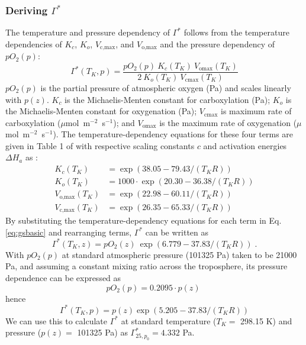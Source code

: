 \documentclass{myreport}
\begin{document}
\subsubsection{Deriving $\Gamma^\ast$}
The temperature and pressure dependency of $\Gamma^\ast$ follows from the temperature dependencies of $K_c$, $K_o$, $V_\text{c,max}$, and $V_\text{o,max}$ and the pressure dependency of $pO_2(p)$:
\begin{equation}
\label{eq:gsbasic}
    \Gamma^\ast (T_K, p) = \frac{pO_2(p)\: K_c(T_K)\: V_\text{omax}(T_K)}
                        {2\: K_o(T_K)\: V_\text{cmax}(T_K)}
\end{equation}
$pO_2(p)$ is the partial pressure of atmospheric oxygen (Pa) and scales linearly with $p(z)$. $K_c$ is the Michaelis-Menten constant for carboxylation (Pa); $K_o$ is the Michaelis-Menten constant for oxygenation (Pa); $V_\text{cmax}$ is maximum rate of carboxylation ($\mu$mol~m$^{-2}$~s$^{-1}$); and $V_\text{omax}$ is the maximum rate of oxygenation ($\mu$mol~m$^{-2}$~s$^{-1}$). The temperature-dependency equations for these four terms are given in Table 1 of \citet{bernacchi01} with respective scaling constants $c$ and activation energies $\Delta H_a$ as :
\begin{subequations}
\begin{align}
    K_c(T_K) &= \exp(38.05-79.43/(T_K R)) \\
    K_o(T_K) &= 1000 \cdot \exp(20.30-36.38/(T_K R)) \\
    V_\text{o,max}(T_K) &= \exp(22.98-60.11/(T_K R)) \\
    V_\text{c,max}(T_K) &= \exp(26.35-65.33/(T_K R))
\end{align}
\end{subequations}
By substituting the temperature-dependency equations for each term in Eq. \ref{eq:gsbasic} and rearranging terms, $\Gamma^\ast$ can be written as
\begin{equation}
    \label{eq:gsto}
    \Gamma^\ast(T_K, z) = pO_2(z)\: \exp(6.779-37.83/(T_K R))\;.
\end{equation}
With $pO_2(p)$ at standard atmospheric pressure (101325 Pa) taken to be 21000 Pa, and assuming a constant mixing ratio across the troposphere, its pressure dependence can be expressed as 
\begin{equation}
    \label{eq:oxy}
    pO_2(p) = 0.2095 \cdot p(z)\;
\end{equation}
hence
\begin{equation}
    \label{eq:gstop}
    \Gamma^\ast(T_K, p) = p(z) \exp(5.205-37.83/(T_K R))  %
\end{equation}
We can use this to calculate $\Gamma^\ast$ at standard temperature ($T_K=$ 298.15 K) and pressure ($p(z)=$ 101325 Pa) as $\Gamma^\ast_{25, p_0} = 4.332$ Pa. 
\end{document}
